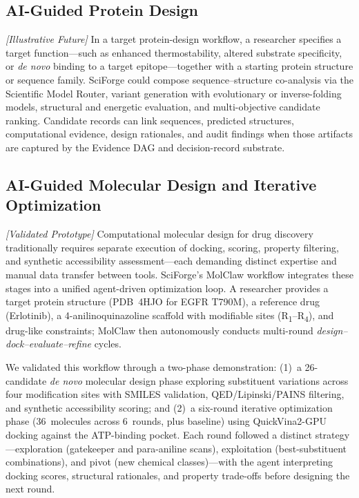 \documentclass[sn-basic,Numbered,pdflatex]{sn-jnl}
\begin{document}
\FloatBarrier
\subsection{AI-Guided Protein Design}

\textit{[Illustrative Future]} In a target protein-design workflow, a researcher specifies a target function---such as enhanced thermostability, altered substrate specificity, or \emph{de novo} binding to a target epitope---together with a starting protein structure or sequence family. SciForge could compose sequence--structure co-analysis via the Scientific Model Router, variant generation with evolutionary or inverse-folding models, structural and energetic evaluation, and multi-objective candidate ranking. Candidate records can link sequences, predicted structures, computational evidence, design rationales, and audit findings when those artifacts are captured by the Evidence DAG and decision-record substrate.


\subsection{AI-Guided Molecular Design and Iterative Optimization}

\textit{[Validated Prototype]} Computational molecular design for drug discovery traditionally requires separate execution of docking, scoring, property filtering, and synthetic accessibility assessment---each demanding distinct expertise and manual data transfer between tools. SciForge's MolClaw workflow integrates these stages into a unified agent-driven optimization loop. A researcher provides a target protein structure (PDB~4HJO for EGFR T790M), a reference drug (Erlotinib), a 4-anilinoquinazoline scaffold with modifiable sites (R\textsubscript{1}--R\textsubscript{4}), and drug-like constraints; MolClaw then autonomously conducts multi-round \emph{design--dock--evaluate--refine} cycles.

We validated this workflow through a two-phase demonstration: (1)~a 26-candidate \emph{de novo} molecular design phase exploring substituent variations across four modification sites with SMILES validation, QED/Lipinski/PAINS filtering, and synthetic accessibility scoring; and (2)~a six-round iterative optimization phase (36~molecules across 6~rounds, plus baseline) using QuickVina2-GPU docking against the ATP-binding pocket. Each round followed a distinct strategy---exploration (gatekeeper and para-aniline scans), exploitation (best-substituent combinations), and pivot (new chemical classes)---with the agent interpreting docking scores, structural rationales, and property trade-offs before designing the next round.
\end{document}
